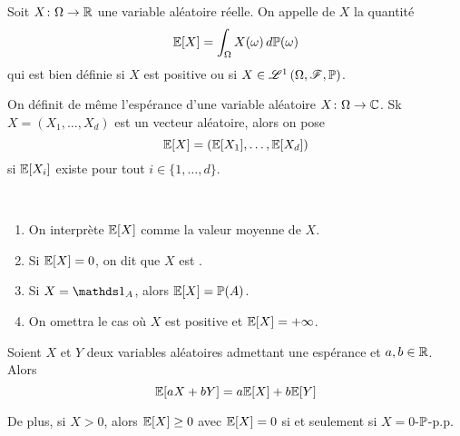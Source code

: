 \begin{definition}
    Soit \(X\colon\Omega\to\mathbb{R}\) une variable aléatoire réelle.
    On appelle  de \( X\) la quantité
    \begin{equation*}
        \mathbb{E}\mathopen{}\left[X\right]\mathclose{} = \int_{\Omega} X(\omega) \mathop{}\!{d}\mathbb{P}(\omega)
    \end{equation*}
    qui est bien définie si \(X\) est positive ou si 
    \(X\in\mathscr{L}^1\left(\Omega, \mathscr{F}, \mathbb{P}\right)\).

    On définit de même l'espérance d'une variable aléatoire
    \(X\colon\Omega\to\mathbb{C}\). Sk \(X=\left(X_1,\ldots,X_d\right)\)
    est un vecteur aléatoire, alors on pose
    \begin{equation*}
        \mathbb{E}\mathopen{}\left[X\right]\mathclose{} = \left(\mathbb{E}\mathopen{}\left[X_1\right]\mathclose{},\ldots,\mathbb{E}\mathopen{}\left[X_d\right]\mathclose{}\right)
    \end{equation*}
    si \(\mathbb{E}\mathopen{}\left[X_i\right]\mathclose{}\) existe pour tout \(i\in\{1,\ldots,d\}\).
\end{definition}

\begin{remark}\,
    \begin{enumerate}
        \item On interprète \(\mathbb{E}\mathopen{}\left[X\right]\mathclose{}\) comme la valeur moyenne de \(X\).

        \item Si \(\mathbb{E}\mathopen{}\left[X\right]\mathclose{} = 0\), on dit que \(X\) est .

        \item Si \(X = \one_A\), alors \(\mathbb{E}\mathopen{}\left[X\right]\mathclose{} = \mathbb{P}(A)\).

        \item On omettra le cas où \(X\) est positive et \(\mathbb{E}\mathopen{}\left[X\right]\mathclose{} = +\infty\).
    \end{enumerate}
\end{remark}

\begin{proposition}
    Soient \(X\) et \(Y\) deux variables aléatoires admettant une espérance
    et \(a,b\in\mathbb{R}\). Alors
    \begin{equation*}
        \mathbb{E}\mathopen{}\left[aX + bY\right]\mathclose{} = a\mathbb{E}\mathopen{}\left[X\right]\mathclose{} + b\mathbb{E}\mathopen{}\left[Y\right]\mathclose{}
    \end{equation*}

    De plus, si \(X>0\), alors \(\mathbb{E}\mathopen{}\left[X\right]\mathclose{}\geq 0\) avec
    \(\mathbb{E}\mathopen{}\left[X\right]\mathclose{} = 0\) si et seulement si \(X=0\)-\(\mathbb{P}\)-p.p.
\end{proposition}

